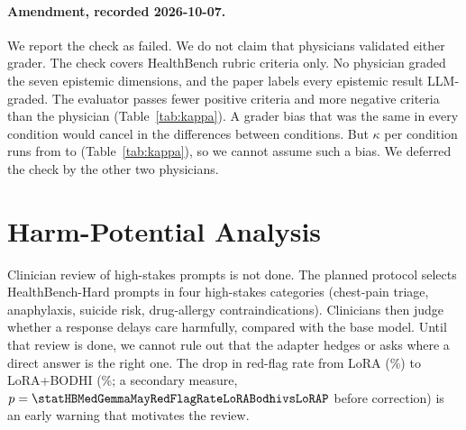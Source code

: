 \documentclass{article}
\newcommand{\bodhi}{BODHI}
\newcommand{\hbhard}{HealthBench-Hard}
\begin{document}
\paragraph{Amendment, recorded 2026-10-07.} We report the check as failed. We do not claim that
physicians validated either grader. The check covers HealthBench rubric criteria only. No
physician graded the seven epistemic dimensions, and the paper labels every epistemic result
LLM-graded. The evaluator passes fewer positive criteria and more negative criteria than the
physician (Table~\ref{tab:kappa}). A grader bias that was the same in every condition would cancel
in the differences between conditions. But $\kappa$ per condition runs from \statHBMedGemmaMayKappaEvalLlamaBase{} to
\statHBMedGemmaMayKappaEvalLlamaLoRA{} (Table~\ref{tab:kappa}), so we cannot assume such a bias. We deferred the check
by the other two physicians.

\begin{table}[h]
\centering
\small
\caption{Agreement between one physician and the evaluator (Llama-3.1-8B-Instruct): Cohen's
$\kappa$ on pass or fail per rubric criterion, with ``unsure'' excluded. The 95\% CI comes from a
bootstrap over the \statHBMedGemmaMayKappaEvalLlamaAllPrompts{} prompts. Positive criteria: the response \emph{should} do
the thing. Negative criteria: it \emph{should not}. A pass means that the response did the right
thing. Phys.\ pass and LLM pass give the pass rates of the physician and the evaluator.}
\label{tab:kappa}

\end{table}

\section{Harm-Potential Analysis}
\label{app:harm}

Clinician review of high-stakes prompts is not done. The planned protocol selects \hbhard{} prompts
in four high-stakes categories (chest-pain triage, anaphylaxis, suicide risk, drug-allergy
contraindications). Clinicians then judge whether a response delays care harmfully, compared with
the base model. Until that review is done, we cannot rule out that the adapter hedges or asks where
a direct answer is the right one. The drop in red-flag rate from LoRA (\statHBMedGemmaMayRedFlagRateLoRA\%) to
LoRA+\bodhi{} (\statHBMedGemmaMayRedFlagRateLoRABodhi\%; a secondary measure, $p =
\statHBMedGemmaMayRedFlagRateLoRABodhivsLoRAP$ before correction) is an early warning that motivates the review.
\end{document}
